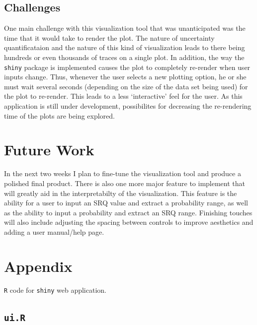 \documentclass[11pt]{asaproc}\usepackage[]{graphicx}\usepackage[]{color}
\begin{document}
\subsection{Challenges}
One main challenge with this visualization tool that was unanticipated was the time that it would take to render the plot. The nature of uncertainty quantificataion and the nature of this kind of visualization leads to there being hundreds or even thousands of traces on a single plot. In addition, the way the {\tt shiny} package is implemented causes the plot to completely re-render when user inputs change. Thus, whenever the user selects a new plotting option, he or she must wait several seconds (depending on the size of the data set being used) for the plot to re-render. This leads to a less `interactive' feel for the user. As this application is still under development, possibilites for decreasing the re-rendering time of the plots are being explored. 

\section{Future Work}
\label{Future}

In the next two weeks I plan to fine-tune the visualization tool and produce a polished final product. There is also one more major feature to implement that will greatly aid in the interpretabilty of the visualization. This feature is the ability for a user to input an SRQ value and extract a probability range, as well as the ability to input a probability and extract an SRQ range. Finishing touches will also include adjusting the spacing between controls to improve aesthetics and adding a user manual/help page. 

\section{Appendix}
\label{Appendix}

{\tt R} code for {\tt shiny} web application.

\subsection{{\tt ui.R}}
\end{document}
